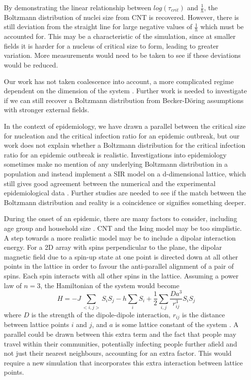 \documentclass{article}
\begin{document}
\begin{multicols*}{2}
By demonstrating the linear relationship between $log(\tau_{crit})$ and $\frac{1}{h}$, the Boltzmann distribution of nuclei size from CNT is recovered. However, there is still deviation from the straight line for large negative values of $\frac{1}{h}$ which must be accounted for. This may be a characteristic of the simulation, since at smaller fields it is harder for a nucleus of critical size to form, leading to greater variation. More measurements would need to be taken to see if these deviations would be reduced.

Our work has not taken coalescence into account, a more complicated regime dependent on the dimension of the system \cite{naskar_fields}. Further work is needed to investigate if we can still recover a Boltzmann distribution from Becker-Döring assumptions with stronger external fields.

In the context of epidemiology, we have drawn a parallel between the critical size for nucleation and the critical infection ratio for an epidemic outbreak, but our work does not explain whether a Boltzmann distribution for the critical infection ratio for an epidemic outbreak is realistic. Investigations into epidemiology sometimes make no mention of any underlying Boltzmann distribution in a population and instead implement a SIR model on a d-dimensional lattice, which still gives good agreement between the numerical and
the experimental epidemiological data \cite{liccardo}. Further studies are needed to see if the match between the Boltzmann distribution and reality is a coincidence or signifies something deeper.

During the onset of an epidemic, there are many factors to consider, including age group and household size \cite{liccardo}. CNT and the Ising model may be too simplistic. A step towards a more realistic model may be to include a dipolar interaction energy. For a 2D array with spins perpendicular to the plane, the dipolar magnetic field due to a spin-up state at one point is directed down at all other points in the lattice in order to favour the anti-parallel alignment of a pair of spins. Each spin interacts with all other spins in the lattice. Assuming a power law of $n = 3$, the Hamiltonian of the system would become
\begin{equation}\label{Hamiltonian_neel}
H = -J\sum_{<i,j>}S_{i}S_{j} - h\sum_{i}S_{i} + \frac{1}{2}\sum_{i,j}\frac{Da^{3}}{r_{ij}^{3}}S_{i}S_{j}
\end{equation}
where $D$ is the strength of the dipole-dipole interaction, $r_{ij}$ is the distance between lattice points $i$ and $j$, and $a$ is some lattice constant of the system \cite{SSS}. A parallel could be drawn between this extra term and the fact that people may travel within their communities, potentially infecting people further afield and not just their nearest neighbours, accounting for an extra factor. This would require a new simulation that incorporates this extra interaction between lattice points.




\printbibliography

\end{multicols*}
\end{document}
